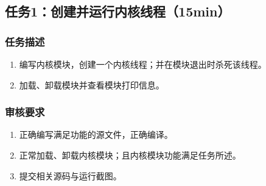 \documentclass{article}
\begin{document}
\subsection{任务1：创建并运行内核线程（15min）}

\subsubsection{任务描述}
\begin{enumerate}
    \item 编写内核模块，创建一个内核线程；并在模块退出时杀死该线程。
    \item 加载、卸载模块并查看模块打印信息。
\end{enumerate}

\subsubsection{审核要求}
\begin{enumerate}
    \item 正确编写满足功能的源文件，正确编译。
    \item 正常加载、卸载内核模块；且内核模块功能满足任务所述。
    \item 提交相关源码与运行截图。
\end{enumerate}
\end{document}
